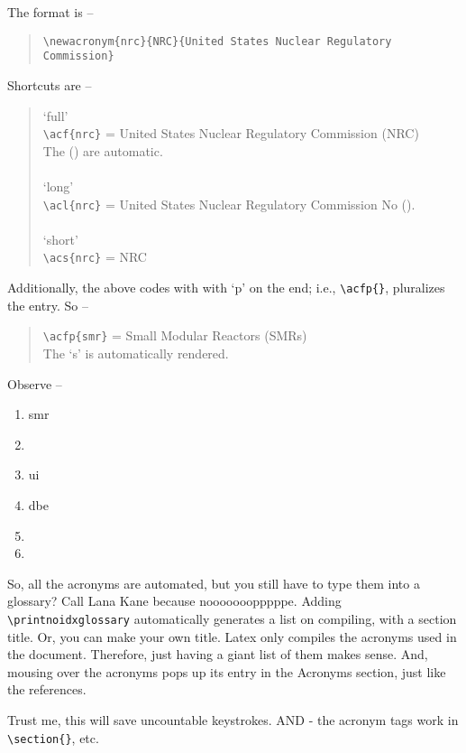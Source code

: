 \documentclass[11pt,a4paper]{article}
\newcommand{\acf}{\acrfull} %
\newcommand{\acl}{\acrlong} %
\newcommand{\acs}{\acrshort} %
\newcommand{\acfp}{\acrfullpl} %
\newcommand{\acsp}{\acrshortpl} %
\begin{document}
The format is --
\begin{quote}
    \verb=\newacronym{nrc}{NRC}{United States Nuclear Regulatory Commission}=
\end{quote}

Shortcuts are -- 
\begin{quote}
    `full'\\
    \verb=\acf{nrc}= = United States Nuclear Regulatory Commission (NRC)\\
    The () are automatic.
    \\ \\
    `long'\\
    \verb=\acl{nrc}= = United States Nuclear Regulatory Commission
    No ().
    \\ \\
    `short'\\
    \verb=\acs{nrc}= = NRC
\end{quote}

Additionally, the above codes with with `p' on the end; i.e., \verb=\acfp{}=, pluralizes the entry. So --
\begin{quote}
    \verb=\acfp{smr}= = Small Modular Reactors (SMRs)\\
    The `s' is automatically rendered.
\end{quote}

Observe --
\begin{enumerate}[topsep=0pt,itemsep=-0.75ex,partopsep=1ex,parsep=1ex,label=(\arabic*)]
    \item\acf{smr}
    \item\acfp{smr}
    \item\acf{ui}
    \item\acf{dbe}
    \item\acfp{dbe}
    \item\acsp{dbe}
\end{enumerate}

So, all the acronyms are automated, but you still have to type them into a glossary? Call Lana Kane because nooooooopppppe. Adding \verb=\printnoidxglossary= automatically generates a list on compiling, with a section title. Or, you can make your own title. Latex only compiles the acronyms used in the document. Therefore, just having a giant list of them makes sense. And, mousing over the acronyms pops up its entry in the Acronyms section, just like the references. 

Trust me, this will save uncountable keystrokes. AND - the acronym tags work in \verb=\section{}=, etc.
\end{document}
